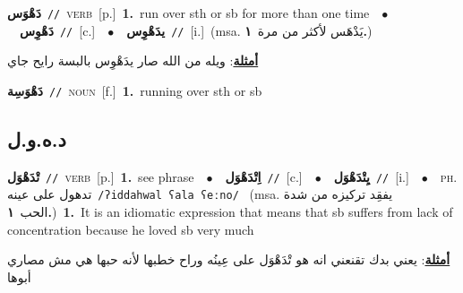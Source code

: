 \documentclass[10pt,a4paper,twoside]{article} %
\begin{document}
\begin{multicols}{2}
{\setlength\topsep{0pt}\textbf{\foreignlanguage{arabic}{دَهْوَس}}\ {\color{gray}\texttt{//}\color{black}}\ \textsc{verb}\ [p.]\ \textbf{1.}~run over sth or sb for more than one time\ \ $\bullet$\ \ \setlength\topsep{0pt}\textbf{\foreignlanguage{arabic}{دَهْوِس}}\ {\color{gray}\texttt{//}\color{black}}\ [c.]\ \ $\bullet$\ \ \setlength\topsep{0pt}\textbf{\foreignlanguage{arabic}{يدَهْوِس}}\ {\color{gray}\texttt{//}\color{black}}\ [i.]\ \color{gray}(msa. \foreignlanguage{arabic}{يَدْهَس لأكثر من مرة}~\foreignlanguage{arabic}{\textbf{١.}})\color{black}\  \begin{flushright}\color{gray}\foreignlanguage{arabic}{\textbf{\underline{\foreignlanguage{arabic}{أمثلة}}}: ويله من الله صار يدَهْوِس بالبسة رايح جاي}\end{flushright}\color{black}} \vspace{2mm}

{\setlength\topsep{0pt}\textbf{\foreignlanguage{arabic}{دَهْوَسِة}}\ {\color{gray}\texttt{//}\color{black}}\ \textsc{noun}\ [f.]\ \textbf{1.}~running over sth or sb\ } \vspace{2mm}

\vspace{-3mm}
\subsection*{\color{blue}\foreignlanguage{arabic}{د.ه.و.ل}\color{blue}{}} 

{\setlength\topsep{0pt}\textbf{\foreignlanguage{arabic}{تْدَهْوَل}}\ {\color{gray}\texttt{//}\color{black}}\ \textsc{verb}\ [p.]\ \textbf{1.}~see phrase\ \ $\bullet$\ \ \setlength\topsep{0pt}\textbf{\foreignlanguage{arabic}{اِتْدَهْوَل}}\ {\color{gray}\texttt{//}\color{black}}\ [c.]\ \ $\bullet$\ \ \setlength\topsep{0pt}\textbf{\foreignlanguage{arabic}{يِتْدَهْوَل}}\ {\color{gray}\texttt{//}\color{black}}\ [i.]\ \ $\bullet$\ \ \textsc{ph.} \color{gray} \foreignlanguage{arabic}{تدهول على عينه}\color{black}\ {\color{gray}\texttt{/{\sffamily ʔiddahwal ʕala ʕeːno}/}\color{black}}\ \color{gray} (msa. \foreignlanguage{arabic}{يفقِد تركيزه من شدة الحب}~\foreignlanguage{arabic}{\textbf{١.}})\color{black}\ \textbf{1.}~It is an idiomatic expression that means that sb suffers from lack of concentration because he loved sb very much\  \begin{flushright}\color{gray}\foreignlanguage{arabic}{\textbf{\underline{\foreignlanguage{arabic}{أمثلة}}}: يعني بدك تقنعني انه هو تْدَهْوَل على عِينُه وراح خطبها لأنه حبها هي مش مصاري أبوها}\end{flushright}\color{black}} \vspace{2mm}


\end{multicols}
\end{document}
